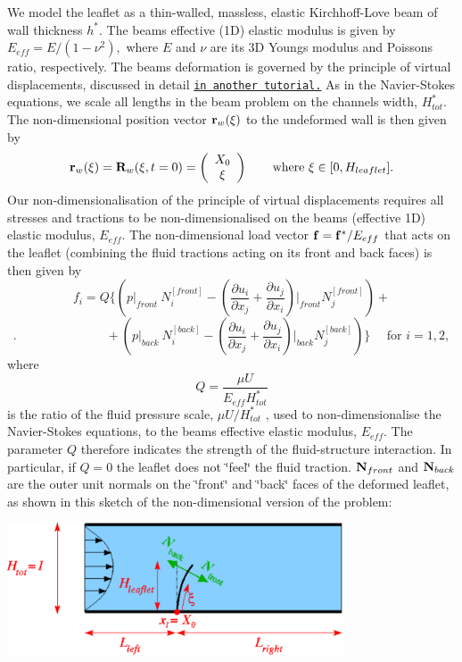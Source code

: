 We model the leaflet as a thin-\/walled, massless, elastic Kirchhoff-\/\+Love beam of wall thickness $ h^* $. The beam\textquotesingle{}s effective (1D) elastic modulus is given by $ E_{eff} = E/(1-\nu^2), $ where $ E $ and $ \nu $ are its 3D Young\textquotesingle{}s modulus and Poisson\textquotesingle{}s ratio, respectively. The beam\textquotesingle{}s deformation is governed by the principle of virtual displacements, discussed in detail \href{../../../beam/tensioned_string/html/index.html}{\tt in another tutorial.} As in the Navier-\/\+Stokes equations, we scale all lengths in the beam problem on the channel\textquotesingle{}s width, $ H^*_{tot}. $ The non-\/dimensional position vector $ {\bf r}_w(\xi) $ to the undeformed wall is then given by \[ {\bf r}_w(\xi) = {\bf R}_w(\xi,t=0) = \left( \begin{array}{c} X_0 \\ \xi \end{array} \right) \ \ \ \ \ \ \mbox{where $\xi \in [0,H_{leaflet}].$} \] Our non-\/dimensionalisation of the principle of virtual displacements requires all stresses and tractions to be non-\/dimensionalised on the beam\textquotesingle{}s (effective 1D) elastic modulus, $ E_{eff} $. The non-\/dimensional load vector $ {\bf f} = {\bf f}^{*}/E_{eff} $ that acts on the leaflet (combining the fluid tractions acting on its front and back faces) is then given by \[ f_i = Q \bigg\{ \left( p\big|_{front} \ N_i^{[front]} - \left( \frac{\partial u_i}{\partial x_j} + \frac{\partial u_j}{\partial x_i} \right)\bigg|_{front} N_j^{[front]} \right) + \] \[ . \hspace{3cm} + \left( p\big|_{back} \ N_i^{[back]} - \left( \frac{\partial u_i}{\partial x_j} + \frac{\partial u_j}{\partial x_i} \right)\bigg|_{back} N_j^{[back]} \right) \bigg\} \ \ \ \ \ \ \mbox{for $i=1,2,$} \] where \[ Q = \frac{\mu U}{E_{eff} H_{tot}^*} \] is the ratio of the fluid pressure scale, $ \mu U/H_{tot}^* $ , used to non-\/dimensionalise the Navier-\/\+Stokes equations, to the beam\textquotesingle{}s effective elastic modulus, $ E_{eff} $. The parameter $ Q $ therefore indicates the strength of the fluid-\/structure interaction. In particular, if $ Q=0 $ the leaflet does not \char`\"{}feel\char`\"{} the fluid traction. $ {\bf N}_{front} $ and $ {\bf N}_{back} $ are the outer unit normals on the \char`\"{}front\char`\"{} and \char`\"{}back\char`\"{} faces of the deformed leaflet, as shown in this sketch of the non-\/dimensional version of the problem\+:

 
\begin{DoxyImage}
\includegraphics[width=0.75\textwidth]{fsi_channel_with_leaflet}
\end{DoxyImage}




